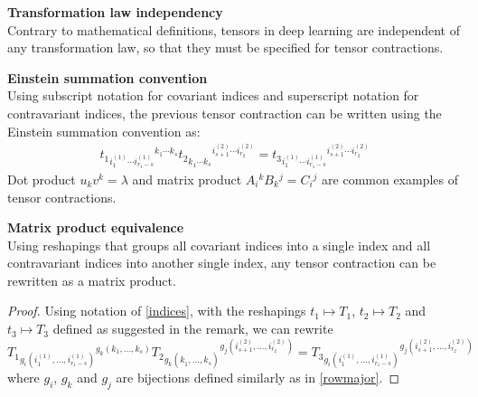 \begin{remark}\textbf{Transformation law independency}\\
Contrary to mathematical definitions, tensors in deep learning are independent of any transformation law, so that they must be specified for tensor contractions.
\end{remark}

\begin{remark}\textbf{Einstein summation convention}\\
Using subscript notation for covariant indices and superscript notation for contravariant indices, the previous tensor contraction can be written using the Einstein summation convention as:
\begin{gather}
t_1 \hspace{0pt}_{i_1^{(1)} \cdots i_{r_1-s}^{(1)} } \hspace{0pt}^{ k_1 \cdots k_s} 
t_2 \hspace{0pt}_{ k_1^{\phantom{(}} \cdots k_s^{\phantom{(}}} \hspace{0pt}^{i_{s+1}^{(2)} \cdots i_{r_2}^{(2)}} =
t_3 \hspace{0pt}_ {i_1^{(1)} \cdots i_{r_1-s}^{(1)} } \hspace{0pt}^{i_{s+1}^{(2)} \cdots i_{r_2}^{(2)}}
\label{indices}
\end{gather}
Dot product $u_k v^k = \lambda $ and matrix product $A_i\hspace{0pt}^k B_k\hspace{0pt}^j = C_i\hspace{0pt}^j$ are common examples of tensor contractions.
\end{remark}

\begin{remark}\textbf{Matrix product equivalence}\\
Using reshapings that groups all covariant indices into a single index and all contravariant indices into another single index, any tensor contraction can be rewritten as a matrix product.
\label{rq:matprodeq}
\end{remark}
\begin{proof}
Using notation of \eqref{indices}, with the reshapings $t_1 \mapsto T_1$, $t_2 \mapsto T_2$ and $t_3 \mapsto T_3$ defined as suggested in the remark, we can rewrite
$$
T_1 \hspace{0pt}_{g_i(i_1^{(1)}, \ldots, i_{r_1-s}^{(1)})} \hspace{0pt}^{g_k(k_1, \ldots, k_s)} 
T_2 \hspace{0pt}_{g_k(k_1^{\phantom{(}}, \ldots, k_s^{\phantom{(}})} \hspace{0pt}^{g_j(i_{s+1}^{(2)}, \ldots, i_{r_2}^{(2)})} =
T_3 \hspace{0pt}_ {g_i(i_1^{(1)}, \ldots, i_{r_1-s}^{(1)})} \hspace{0pt}^{g_j(i_{s+1}^{(2)}, \ldots, i_{r_2}^{(2)})}
$$
where $g_i$, $g_k$ and $g_j$ are bijections defined similarly as in \eqref{rowmajor}.
\end{proof}

